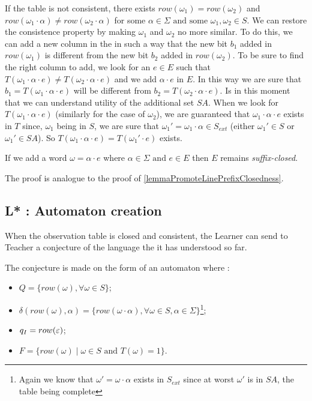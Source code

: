 If the table is not consistent, there exists $row(\omega_1) = row(\omega_2)$ and $row(\omega_1 \cdot \alpha) \neq row(\omega_2 \cdot \alpha)$ for some $\alpha \in \Sigma \text{ and some }\omega_1, \omega_2 \in S$. We can restore the consistence property by making $\omega_1$ and $\omega_2$ no more similar. To do this, we can add a new column in the \OT in such a way that the new bit $b_1$ added in $row(\omega_1)$ is different from the new bit $b_2$ added in $row(\omega_2)$. To be sure to find the right column to add, we look for an $e \in E$ such that $T(\omega_1 \cdot \alpha \cdot e) \neq T(\omega_2 \cdot \alpha \cdot e)$ and we add $\alpha \cdot e$ in $E$. In this way we are sure that $b_1 = T(\omega_1 \cdot \alpha \cdot e)$ will be different from $b_2 = T(\omega_2 \cdot \alpha \cdot e)$. Is in this moment that we can understand utility of the additional set $SA$. When we look for $T(\omega_1 \cdot \alpha \cdot e)$ (similarly for the case of $\omega_2$), we are guaranteed that $\omega_1 \cdot \alpha \cdot e$ exists in $T$ since, $\omega_1$ being in $S$, we are sure that $\omega_1' = \omega_1 \cdot \alpha \in S_{ext}$ (either $\omega_1' \in S$ or $\omega_1' \in SA$). So $T(\omega_1 \cdot \alpha \cdot e) = T(\omega_1' \cdot e)$ exists.

\begin{lemma}
  If we add a word $\omega = \alpha \cdot e$ where $\alpha \in \Sigma \text{ and } e \in E$ then $E$ remains \textit{suffix-closed}.
\end{lemma}

The proof is analogue to the proof of \cref{lemmaPromoteLinePrefixClosedness}.

\subsection{L* : Automaton creation}

When the observation table is closed and consistent, the Learner can send to Teacher a conjecture of the language the it has understood so far.

The conjecture is made on the form of an automaton where :
\begin{itemize}
  \item $Q = \{row(\omega), \forall \omega \in S\}$;
  \item $\delta(row(\omega), \alpha) = \{row(\omega \cdot \alpha), \forall \omega \in S, \alpha \in \Sigma\}$\footnote{Again we know that $\omega' = \omega\cdot\alpha$ exists in $S_{ext}$ since at worst $\omega'$ is in $SA$, the table being complete };
  \item $q_I = row(\varepsilon)$;
  \item $F = \{row(\omega) \mid \omega \in S \text{ and } T(\omega) = 1 \}$.
\end{itemize}

